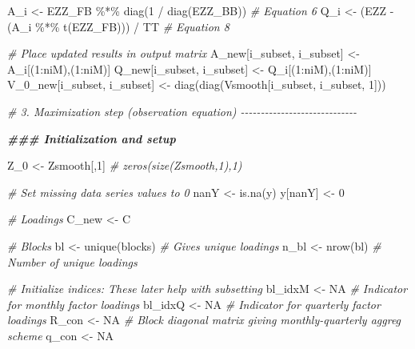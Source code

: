 \documentclass[
]{article}
\newenvironment{Shaded}{\begin{snugshade}}{\end{snugshade}}
\newcommand{\CommentTok}[1]{\textcolor[rgb]{0.56,0.35,0.01}{\textit{#1}}}
\newcommand{\ConstantTok}[1]{\textcolor[rgb]{0.00,0.00,0.00}{#1}}
\newcommand{\DecValTok}[1]{\textcolor[rgb]{0.00,0.00,0.81}{#1}}
\newcommand{\DocumentationTok}[1]{\textcolor[rgb]{0.56,0.35,0.01}{\textbf{\textit{#1}}}}
\newcommand{\FunctionTok}[1]{\textcolor[rgb]{0.00,0.00,0.00}{#1}}
\newcommand{\NormalTok}[1]{#1}
\newcommand{\OtherTok}[1]{\textcolor[rgb]{0.56,0.35,0.01}{#1}}
\newcommand{\SpecialCharTok}[1]{\textcolor[rgb]{0.00,0.00,0.00}{#1}}
\begin{document}
\begin{Shaded}
\begin{Highlighting}[]
\NormalTok{  A\_i }\OtherTok{\textless{}{-}}\NormalTok{ EZZ\_FB }\SpecialCharTok{\%*\%} \FunctionTok{diag}\NormalTok{(}\DecValTok{1} \SpecialCharTok{/} \FunctionTok{diag}\NormalTok{(EZZ\_BB)) }\CommentTok{\# Equation 6}
\NormalTok{  Q\_i }\OtherTok{\textless{}{-}}\NormalTok{ (EZZ }\SpecialCharTok{{-}}\NormalTok{ (A\_i }\SpecialCharTok{\%*\%} \FunctionTok{t}\NormalTok{(EZZ\_FB))) }\SpecialCharTok{/}\NormalTok{ TT }\CommentTok{\# Equation 8}
  
  \CommentTok{\# Place updated results in output matrix}
\NormalTok{  A\_new[i\_subset, i\_subset] }\OtherTok{\textless{}{-}}\NormalTok{ A\_i[(}\DecValTok{1}\SpecialCharTok{:}\NormalTok{niM),(}\DecValTok{1}\SpecialCharTok{:}\NormalTok{niM)]}
\NormalTok{  Q\_new[i\_subset, i\_subset] }\OtherTok{\textless{}{-}}\NormalTok{ Q\_i[(}\DecValTok{1}\SpecialCharTok{:}\NormalTok{niM),(}\DecValTok{1}\SpecialCharTok{:}\NormalTok{niM)]}
\NormalTok{  V\_0\_new[i\_subset, i\_subset] }\OtherTok{\textless{}{-}} \FunctionTok{diag}\NormalTok{(}\FunctionTok{diag}\NormalTok{(Vsmooth[i\_subset, i\_subset, }\DecValTok{1}\NormalTok{]))}
  
  \CommentTok{\# 3. Maximization step (observation equation) {-}{-}{-}{-}{-}{-}{-}{-}{-}{-}{-}{-}{-}{-}{-}{-}{-}{-}{-}{-}{-}{-}{-}{-}{-}{-}{-}{-}{-}}
  
  \DocumentationTok{\#\#\# Initialization and setup}
  
\NormalTok{  Z\_0 }\OtherTok{\textless{}{-}}\NormalTok{ Zsmooth[,}\DecValTok{1}\NormalTok{] }\CommentTok{\# zeros(size(Zsmooth,1),1)}
  
  \CommentTok{\# Set missing data series values to 0}
\NormalTok{  nanY }\OtherTok{\textless{}{-}} \FunctionTok{is.na}\NormalTok{(y)}
\NormalTok{  y[nanY] }\OtherTok{\textless{}{-}} \DecValTok{0}
  
  \CommentTok{\# Loadings}
\NormalTok{  C\_new }\OtherTok{\textless{}{-}}\NormalTok{ C}
  
  \CommentTok{\# Blocks}
\NormalTok{  bl }\OtherTok{\textless{}{-}} \FunctionTok{unique}\NormalTok{(blocks) }\CommentTok{\# Gives unique loadings}
\NormalTok{  n\_bl }\OtherTok{\textless{}{-}} \FunctionTok{nrow}\NormalTok{(bl) }\CommentTok{\# Number of unique loadings}
  
  \CommentTok{\# Initialize indices: These later help with subsetting}
\NormalTok{  bl\_idxM }\OtherTok{\textless{}{-}} \ConstantTok{NA} \CommentTok{\# Indicator for monthly factor loadings}
\NormalTok{  bl\_idxQ }\OtherTok{\textless{}{-}} \ConstantTok{NA} \CommentTok{\# Indicator for quarterly factor loadings}
\NormalTok{  R\_con }\OtherTok{\textless{}{-}} \ConstantTok{NA} \CommentTok{\# Block diagonal matrix giving monthly{-}quarterly aggreg scheme}
\NormalTok{  q\_con }\OtherTok{\textless{}{-}} \ConstantTok{NA}
  

\end{Highlighting}
\end{Shaded}
\end{document}
